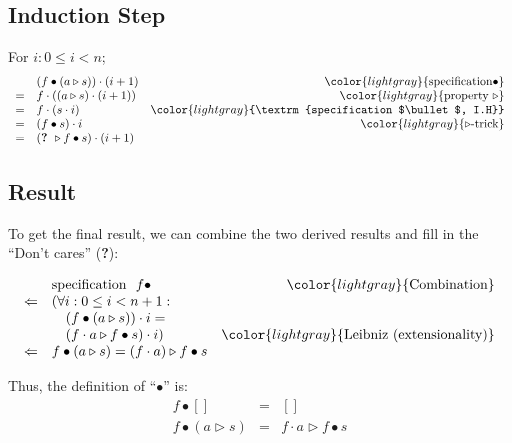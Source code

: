 \documentclass[onesided]{memoir}
\begin{document}
        
        \subsection{Induction Step}
        For $i: 0 \leq i < n$;
        \begin{displaymath} \begin{array}{llr}
        
          &  (f \bullet(a\triangleright s)) \cdot (i+1) & \color{lightgray}{\textrm{specification} \bullet} \\
        = & f \cdot ( (a\triangleright s)\cdot (i+1))   & \color{lightgray}{\textrm{property~} \triangleright}\\
        = & f\cdot (s\cdot i)                            & \color{lightgray}{\textrm{specification $\bullet$, I.H}}\\
        = & (f \bullet s) \cdot i                       & \color{lightgray}{\triangleright \textrm{-trick}}\\
        = & ( \textbf{?~}\triangleright f\bullet s ) \cdot (i+1) & 
        \end{array} \end{displaymath}        

        \subsection{Result}
        To get the final result, we can combine the two derived results and fill in the ``Don't cares'' (\textbf{?}):
        
        \begin{displaymath} \begin{array}{llr}
          &  \textrm{specification ~} f\bullet  & \color{lightgray}{\textrm{Combination}} \\
        \Leftarrow & (\forall i: 0 \leq i < n+1:  & \\
        & \quad (f\bullet(a\triangleright s))\cdot i= & \\
        & \quad (f\cdot a \triangleright f \bullet s)\cdot i ) & \color{lightgray}{\textrm{Leibniz (extensionality)}} \\
        \Leftarrow & f \bullet (a \triangleright s) = (f \cdot a) \triangleright f \bullet s
        \end{array} \end{displaymath}

        Thus, the definition of ``$\bullet$'' is:
        \begin{displaymath} \begin{array}{lcl}
            f \bullet [] & = & [] \\
            f \bullet (a\triangleright s) & = & f\cdot a \triangleright f \bullet s
        \end{array} \end{displaymath}
        
\end{document}
